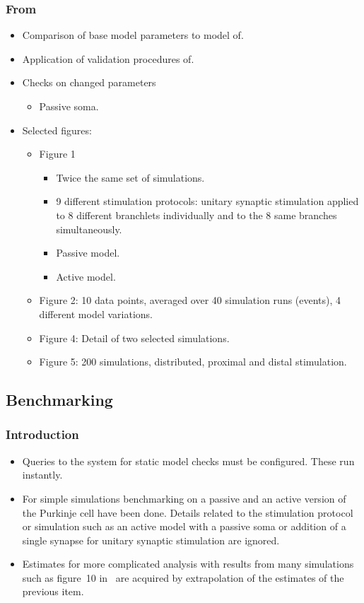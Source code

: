 \documentclass[12pt]{article}
\begin{document}
\subsubsection*{From~\cite{schutter94:_simul_purkin}}

\begin{itemize}
\item Comparison of base model parameters to model of\cite{E:1994hc}.
\item Application of validation procedures of\cite{De-Schutter-E:1994vn}.
\item Checks on changed parameters
  \begin{itemize}
  \item Passive soma.
  \end{itemize}
\item Selected figures:
  \begin{itemize}
  \item Figure 1
    \begin{itemize}
    \item Twice the same set of simulations.
    \item 9 different stimulation protocols: unitary synaptic
      stimulation applied to 8 different branchlets individually and
      to the 8 same branches simultaneously.
    \item Passive model.
    \item Active model.
    \end{itemize}
  \item Figure 2: 10 data points, averaged over 40 simulation runs
    (events), 4 different model variations.
  \item Figure 4: Detail of two selected simulations.
  \item Figure 5: 200 simulations, distributed, proximal and distal
    stimulation.
  \end{itemize}
\end{itemize}

\subsection*{Benchmarking}

\subsubsection*{Introduction}

\begin{itemize}
\item Queries to the system for static model checks must be
  configured.  These run instantly.
\item For simple simulations benchmarking on a passive and an active
  version of the Purkinje cell have been done.  Details related to the
  stimulation protocol or simulation such as an active model with a
  passive soma or addition of a single synapse for unitary synaptic
  stimulation are ignored.
\item Estimates for more complicated analysis with results from many
  simulations such as figure~10 in~\cite{E:1994hc} are acquired by
  extrapolation of the estimates of the previous item.
\end{itemize}
\end{document}
